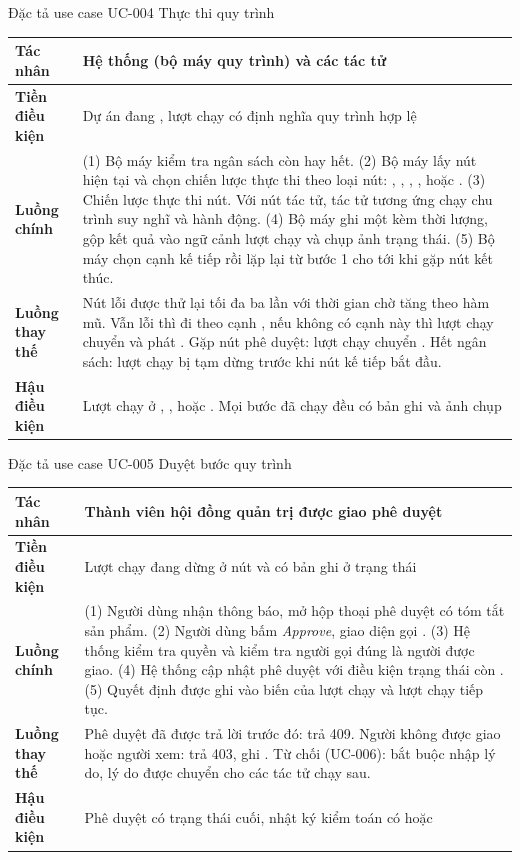 \begin{table}{Đặc tả use case UC-004 Thực thi quy trình}
\label{tab:uc004}
\small
\begin{tabularx}{\textwidth}{|P{2.8cm}|L|}
\hline
\textbf{Tác nhân} & Hệ thống (bộ máy quy trình) và các tác tử \\ \hline
\textbf{Tiền điều kiện} & Dự án đang , lượt chạy có định nghĩa quy trình hợp lệ \\ \hline
\textbf{Luồng chính} &
(1) Bộ máy kiểm tra ngân sách còn hay hết.
(2) Bộ máy lấy nút hiện tại và chọn chiến lược thực thi theo loại nút: , , , ,  hoặc .
(3) Chiến lược thực thi nút. Với nút tác tử, tác tử tương ứng chạy chu trình suy nghĩ và hành động.
(4) Bộ máy ghi một  kèm thời lượng, gộp kết quả vào ngữ cảnh lượt chạy và chụp ảnh trạng thái.
(5) Bộ máy chọn cạnh kế tiếp rồi lặp lại từ bước 1 cho tới khi gặp nút kết thúc. \\ \hline
\textbf{Luồng thay thế} & Nút lỗi được thử lại tối đa ba lần với thời gian chờ tăng theo hàm mũ. Vẫn lỗi thì đi theo cạnh , nếu không có cạnh này thì lượt chạy chuyển  và phát . Gặp nút phê duyệt: lượt chạy chuyển . Hết ngân sách: lượt chạy bị tạm dừng trước khi nút kế tiếp bắt đầu. \\ \hline
\textbf{Hậu điều kiện} & Lượt chạy ở , ,  hoặc . Mọi bước đã chạy đều có bản ghi và ảnh chụp \\ \hline
\end{tabularx}
\end{table}

\begin{table}{Đặc tả use case UC-005 Duyệt bước quy trình}
\label{tab:uc005}
\small
\begin{tabularx}{\textwidth}{|P{2.8cm}|L|}
\hline
\textbf{Tác nhân} & Thành viên hội đồng quản trị được giao phê duyệt \\ \hline
\textbf{Tiền điều kiện} & Lượt chạy đang dừng ở nút  và có bản ghi  ở trạng thái  \\ \hline
\textbf{Luồng chính} &
(1) Người dùng nhận thông báo, mở hộp thoại phê duyệt có tóm tắt sản phẩm.
(2) Người dùng bấm \textit{Approve}, giao diện gọi .
(3) Hệ thống kiểm tra quyền và kiểm tra người gọi đúng là người được giao.
(4) Hệ thống cập nhật phê duyệt với điều kiện trạng thái còn .
(5) Quyết định được ghi vào biến của lượt chạy và lượt chạy tiếp tục. \\ \hline
\textbf{Luồng thay thế} & Phê duyệt đã được trả lời trước đó: trả 409. Người không được giao hoặc người xem: trả 403, ghi . Từ chối (UC-006): bắt buộc nhập lý do, lý do được chuyển cho các tác tử chạy sau. \\ \hline
\textbf{Hậu điều kiện} & Phê duyệt có trạng thái cuối, nhật ký kiểm toán có  hoặc  \\ \hline
\end{tabularx}
\end{table}

